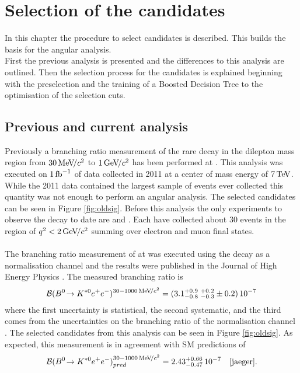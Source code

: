 \chapter{Selection of the \BdKstee candidates}
\label{Chapter4}
In this chapter the procedure to select \BdKstee candidates is described. This builds the basis for the angular analysis.\\
First the previous \BdKstee analysis is presented and the differences to this analysis are outlined. Then the selection process for the \BdKstee candidates is explained beginning with the preselection and the training of a Boosted Decision Tree to the optimisation of the selection cuts.\\

\section{Previous and current \BdKstee analysis}
Previously a branching ratio measurement of the rare \BdKstee decay in the dilepton mass region from $30{\mathrm{\,Me\kern -0.1em V\!/}c^2}$ to $1 {\mathrm{\,Ge\kern -0.1em V\!/}c^2}$ has been performed at \lhcb. This analysis was executed on $1 \mbox{\,fb}^{-1}$ of data collected in 2011 at a center of mass energy of $7 \mathrm{\,Te\kern -0.1em V}$. 
While the 2011 \lhcb data contained the largest sample of \BdKstee events ever collected this quantity was not enough to perform an angular analysis.  The selected \BdKstee candidates can be seen in Figure \ref{fig:oldsig}.
Before this analysis the only experiments to observe the \BdKstee decay to date are \babar \cite{babar} and \belle \cite{belle}. Each have collected about 30 \BdKstll events in the region of $q^2 < 2{\mathrm{\,Ge\kern -0.1em V\!/}c^2}$ summing over electron and muon final states.\\
\\
The branching ratio measurement of \BdKstee at \lhcb was executed using the \BdToJPsieeKst decay as a normalisation channel and the results were published in the Journal of High Energy Physics \cite{paper}. The measured branching ratio is
\begin{equation}
\BR(\BdKstee)^{30 -1000\mevcc} = (3.1^{+0.9 \ +0.2}_{-0.8 \ -0.3} \pm 0.2) \, 10^{-7}
\end{equation}
where the first uncertainty is statistical, the second systematic, and the third comes from the uncertainties on the branching ratio of the normalisation channel \BdToJPsieeKst. The selected \BdKstee candidates from this analysis can be seen in Figure \ref{fig:oldsig}. As expected, this measurement is in agreement with SM predictions of 
\begin{equation}
{\ensuremath{\cal B}}(B^0\!\rightarrow K^{*0}e^+e^-)^{30 -1000{\mathrm{\,Me\kern -0.1em V\!/}c^2}}_{pred} = 2.43^{+0.66}_{-0.47}\, 10^{-7} \quad \cite{jaeger}.
\end{equation}

